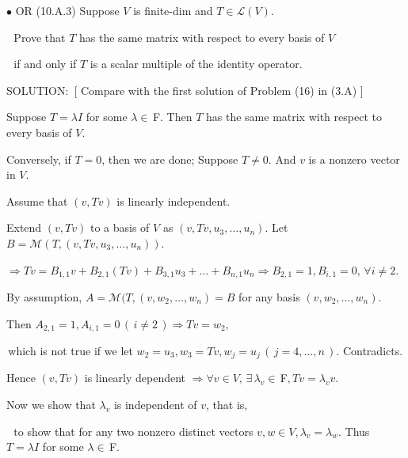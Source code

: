 \documentclass[a4paper, 11pt, UTF8]{article}
\def\Lm{\mathcal{L}}
\def\Mt{\mathcal{M}}
\def\Fbfc{$\,{\timesbf F}$}
\begin{document}
\begin{large}
{\small $\bullet$} O{\small R} (10.A.3) {\timessl\Large 
Suppose $V$ is finite-dim and $T\in\Lm(V)$.}\par\,\,
{\timessl\Large Prove that $T$ has the same matrix with respect to every basis of $V$}\par\,\,
{\timessl\Large if and only if $T$ is a scalar multiple of the identity operator.
}\par
{\timesbf S\footnotesize{OLUTION:}}\,\,\,[ Compare with the first solution of Problem (16) in (3.A) ]\par\quad
Suppose $T=\lambda I$ for some $\lambda\in\Fbfc.$ Then $T$ has the same matrix with respect to every basis of $V$.\par\quad
Conversely, if $T=0$, then we are done; Suppose $T\neq 0.$
And $v$ is a nonzero vector in $V$.\par\quad
 Assume that $(v,Tv)$ is linearly independent.\par\quad
Extend $(v,Tv)$ to a basis of $V$ as $(v,Tv,u_3,\dots,u_n).$ Let $B=\Mt(T,(v,Tv,u_3,\dots,u_n)).$\par\quad
$\Rightarrow Tv=B_{1,1} v+B_{2,1}(Tv)+B_{3,1}u_3+\dots+B_{n,1}u_n\Rightarrow B_{2,1}=1,B_{i,1}=0,\,\forall i\neq 2.$\par\quad
By assumption, $A=\Mt(T,(v,w_2,\dots,w_{n})=B$ for any basis $(v,w_2,\dots,w_{n})$.\par\quad
Then $A_{2,1}=1,A_{i,1}=0\,(\,i\neq 2\,)\Rightarrow Tv=w_2,$\par\qquad\qquad\qquad\quad\,which is not true if we let $w_2=u_3,w_3=Tv,w_j=u_j\,(\,j=4,\dots,n\,).$ Contradicts.\par\quad
Hence $(v,Tv)$ is linearly dependent $\Rightarrow \forall v\in V,\,\exists\,\lambda_v\in\Fbfc,Tv=\lambda_v v.$\par\quad
Now we show that $\lambda_v$ is independent of $v$, that is, \par\qquad\quad\,\,
to show that for any two nonzero distinct vectors $v,w\in V,\lambda_v=\lambda_w$. Thus $T=\lambda I$ for some $\lambda\in\Fbfc.$\par\qquad{}
\end{large}
\end{document}
